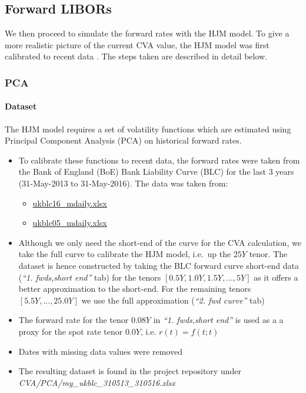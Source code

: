 \documentclass[reqno]{article}
\begin{document}
\newpage

    \subsection{Forward LIBORs}\label{forward-libors}

    We then proceed to simulate the forward rates  with the
HJM model. To give a
more realistic picture of the current CVA value, the HJM model was first calibrated to recent data . The steps taken are described
in detail below.

    \subsubsection{PCA}\label{pca}

    \paragraph{Dataset}\label{dataset}

    The HJM model requires a set of volatility functions which are estimated
using Principal Component Analysis (PCA) on historical forward rates.

\begin{itemize}
\item
  To calibrate these functions to recent data, the forward rates were
  taken from the Bank of England (BoE) Bank Liability Curve (BLC) for the last 3 years (31-May-2013 to 31-May-2016).
  The data was taken from:
  \begin{itemize}
\item
  \href{http://www.bankofengland.co.uk/statistics/Documents/yieldcurve/ukblc16_mdaily.xlsx}{ukblc16\_mdaily.xlsx}
\item
  \href{http://www.bankofengland.co.uk/statistics/Documents/yieldcurve/ukblc05_mdaily.xlsx}{ukblc05\_mdaily.xlsx}
  \end{itemize}
\item
  Although we only need the short-end of the curve for the CVA
  calculation, we take the full curve to calibrate the HJM model,
  i.e.~up the \(25Y\) tenor. The dataset is hence constructed by taking
  the BLC forward curve short-end data (\emph{``1. fwds,short end''}
  tab) for the tenors \([0.5Y, 1.0Y, 1.5Y, ..., 5Y]\) as it offers a
  better approximation to the short-end. For the remaining tenors
  \([5.5Y, ..., 25.0Y]\) we use the full approximation (\emph{``2. fwd
  curve''} tab)
\item
  The forward rate for the tenor \(0.08Y\) in \emph{``1. fwds,short
  end''} is used as a a proxy for the spot rate tenor \(0.0Y\), i.e.
  \(r(t) = f(t;t)\)
\item
  Dates with missing data values were removed
\item
  The resulting dataset is found in the project repository under
  \emph{CVA/PCA/my\_ukblc\_310513\_310516.xlsx}
\end{itemize}
\end{document}
